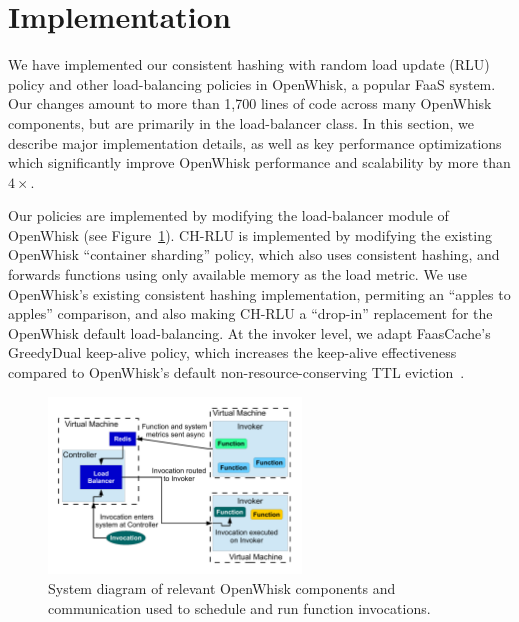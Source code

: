 \section{Implementation}
\label{sec:impl}

We have implemented our consistent hashing with random load update (RLU) policy and other load-balancing policies in OpenWhisk, a popular FaaS system.
Our changes amount to more than 1,700 lines of code across many OpenWhisk components, but are primarily in the load-balancer class. 
In this section, we describe major implementation details, as well as key performance optimizations which significantly improve OpenWhisk performance and scalability by more than $4\times$. 

Our policies are implemented by modifying the load-balancer module of OpenWhisk (see Figure~\ref{fig:sys-diag}).
CH-RLU is implemented by modifying the existing OpenWhisk ``container sharding'' policy, which also uses consistent hashing, and forwards functions using only available memory as the load metric.
We use OpenWhisk's existing consistent hashing implementation, permiting an ``apples to apples'' comparison, and also making CH-RLU a ``drop-in'' replacement for the OpenWhisk default load-balancing. 
At the invoker level, we adapt FaasCache's GreedyDual keep-alive policy, which increases the keep-alive effectiveness compared to OpenWhisk's default non-resource-conserving TTL eviction~\cite{faascache-asplos21}. 

\begin{figure}  
  \centering
  \includegraphics[width=0.6\textwidth]{chrlu/faaslb-osdi22/figs/sys-diag.pdf}
  \caption{System diagram of relevant OpenWhisk components and communication used to schedule and run function invocations.}
  \label{fig:sys-diag}
\end{figure}

